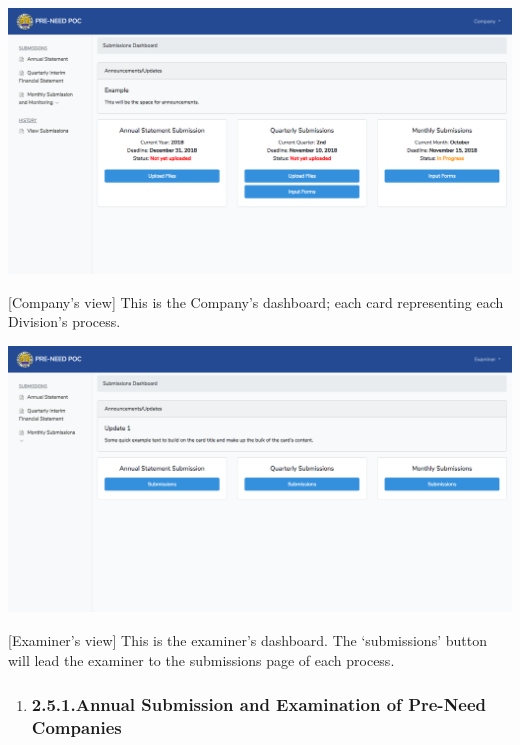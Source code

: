 \documentclass{article}
\begin{document}
\noindent{}\includegraphics[keepaspectratio=true]{up-ic-screens/image199}{}%

[Company’s view] This is the Company’s dashboard;
each card representing each Division’s process.%

\includegraphics[keepaspectratio=true]{up-ic-screens/image113}{}%

[Examiner’s view] This is the examiner’s dashboard.
The ‘submissions’ button will lead the examiner to the submissions page
of each process.%

\begin{enumerate}[noitemsep,topsep=\mdcompacttopsep]%

\item{}
\subsubsection{2.5.1.\hspace*{0.5em}Annual Submission and Examination of Pre-Need Companies}\label{sec-annual-submission-and-examination-of-pre-need-companies}%
\end{enumerate}%
\end{document}
